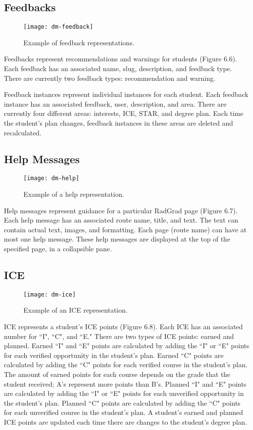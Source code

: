 \subsection{Feedbacks}
\begin{figure}[htbp!]
\centering
\texttt{[image: dm-feedback]}
\caption{Example of feedback representations.}
\end{figure}
Feedbacks represent recommendations and warnings for students (Figure 6.6). Each feedback has an associated name, slug, description, and feedback type. There are currently two feedback types: recommendation and warning. 

Feedback instances represent individual instances for each student. Each feedback instance has an associated feedback, user, description, and area. There are currently four different areas: interests, ICE, STAR, and degree plan. Each time the student's plan changes, feedback instances in these areas are deleted and recalculated.

\subsection{Help Messages}
\begin{figure}[htbp!]
\centering
\texttt{[image: dm-help]}
\caption{Example of a help representation.}
\end{figure}
Help messages represent guidance for a particular RadGrad page (Figure 6.7). Each help message has an associated route name, title, and text. The text can contain actual text, images, and formatting. Each page (route name) can have at most one help message. These help messages are displayed at the top of the specified page, in a collapsible pane.  

\subsection{ICE}
\begin{figure}[htbp!]
\centering
\texttt{[image: dm-ice]}
\caption{Example of an ICE representation.}
\end{figure}
ICE represents a student's ICE points (Figure 6.8). Each ICE has an associated number for ``I", ``C", and ``E." There are two types of ICE points: earned and planned. Earned ``I" and ``E" points are calculated by adding the ``I" or ``E" points for each verified opportunity in the student's plan. Earned ``C" points are calculated by adding the ``C" points for each verified course in the student's plan. The amount of earned points for each course depends on the grade that the student received; A's represent more points than B's. Planned ``I" and ``E" points are calculated by adding the ``I" or ``E" points for each unverified opportunity in the student's plan. Planned ``C" points are calculated by adding the ``C" points for each unverified course in the student's plan. A student's earned and planned ICE points are updated each time there are changes to the student's degree plan. 

